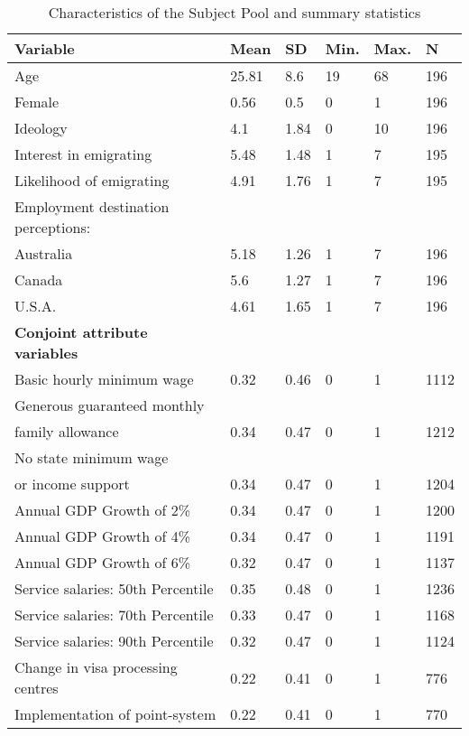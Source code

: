 \documentclass[12pt]{article}
\begin{document}
\begin{appendices}
\begin{table}[!htbp]
\caption{Characteristics of the Subject Pool and summary statistics}\label{tab:subjects}
\begin{center}
\begin{tabular}{llllll}
  \hline
\textbf{Variable} & \textbf{Mean} & \textbf{SD} & \textbf{Min}. & \textbf{Max}. & \textbf{N} \\ 
  \hline
Age & 25.81 & 8.6 & 19 & 68 & 196 \\
Female & 0.56 & 0.5 & 0 & 1 & 196 \\
Ideology & 4.1 & 1.84 & 0 & 10 & 196 \\
Interest in emigrating & 5.48 & 1.48 & 1 & 7 & 195 \\ 
Likelihood of emigrating & 4.91 & 1.76 & 1 & 7 & 195 \\
  \hline
Employment destination perceptions: & & & & & \\
   \hline
 Australia & 5.18 & 1.26 & 1 & 7 & 196 \\ 
  Canada & 5.6 & 1.27 & 1 & 7 & 196 \\ 
  U.S.A. & 4.61 & 1.65 & 1 & 7 & 196 \\ 
  \hline
  \textbf{Conjoint attribute variables} & & & & & \\
  \hline
  Basic hourly minimum wage & 0.32 & 0.46 & 0 & 1 & 1112 \\ 
  Generous guaranteed monthly  & &  & &  &  \\
  family allowance & 0.34 & 0.47 & 0 & 1 & 1212 \\ 
  No state minimum wage  & &  & &  &  \\
  or income support & 0.34 & 0.47 & 0 & 1 & 1204 \\ 
  Annual GDP Growth of 2\% & 0.34 & 0.47 & 0 & 1 & 1200 \\ 
  Annual GDP Growth of 4\% & 0.34 & 0.47 & 0 & 1 & 1191 \\ 
  Annual GDP Growth of 6\% & 0.32 & 0.47 & 0 & 1 & 1137 \\ 
  Service salaries: 50th Percentile & 0.35 & 0.48 & 0 & 1 & 1236 \\ 
  Service salaries: 70th Percentile & 0.33 & 0.47 & 0 & 1 & 1168 \\ 
  Service salaries: 90th Percentile & 0.32 & 0.47 & 0 & 1 & 1124 \\ 
  Change in visa processing centres & 0.22 & 0.41 & 0 & 1 & 776 \\ 
  Implementation of point-system & 0.22 & 0.41 & 0 & 1 & 770 \\ 

\end{tabular}
\end{center}
\end{table}
\end{appendices}
\end{document}
